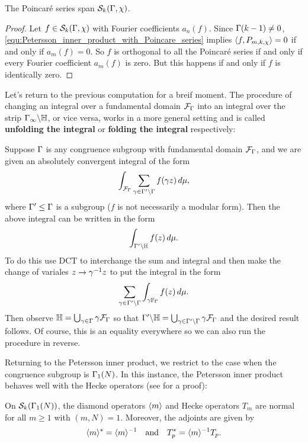       \begin{theorem}
        The Poincar\'e series span $\mathcal{S}_{k}(\Gamma,\chi)$.
      \end{theorem}
      \begin{proof}
        Let $f \in \mathcal{S}_{k}(\Gamma,\chi)$ with Fourier coefficients $a_{n}(f)$. Since $\Gamma(k-1) \neq 0$, \cref{equ:Petersson_inner_product_with_Poincare_series} implies $\langle f,P_{m,k,\chi}\rangle = 0$ if and only if $a_{m}(f) = 0$. So $f$ is orthogonal to all the Poincar\'e series if and only if every Fourier coefficient $a_{m}(f)$ is zero. But this happens if and only if $f$ is identically zero.
      \end{proof}

      Let's return to the previous computation for a breif moment. The procedure of changing an integral over a fundamental domain $\mathcal{F}_{\Gamma}$ into an integral over the strip $\Gamma_{\infty}\backslash\mathbb{H}$, or vice versa, works in a more general setting and is called \textbf{unfolding the integral} or \textbf{folding the integral} respectively:

      \begin{method}
        Suppose $\Gamma$ is any congruence subgroup with fundamental domain $\mathcal{F}_{\Gamma}$, and we are given an absolutely convergent integral of the form
        \[
          \int_{\mathcal{F}_{\Gamma}}\sum_{\gamma \in \Gamma'\backslash\Gamma}f(\gamma z)\,d\mu,
        \]
        where $\Gamma' \le \Gamma$ is a subgroup ($f$ is not necessarily a modular form). Then the above integral can be written in the form
        \[
          \int_{\Gamma'\backslash\mathbb{H}}f(z)\,d\mu.
        \]
        To do this use DCT to interchange the sum and integral and then make the change of variales $z \to \gamma^{-1}z$ to put the integral in the form
        \[
          \sum_{\gamma \in \Gamma'\backslash\Gamma}\int_{\gamma\mathbb{F}_{\Gamma}}f(z)\,d\mu.
        \]
        Then observe $\mathbb{H} = \bigcup_{\gamma \in \Gamma}\gamma\mathcal{F}_{\Gamma}$ so that $\Gamma'\backslash\mathbb{H} = \bigcup_{\gamma \in \Gamma'\backslash\Gamma}\gamma\mathcal{F}_{\Gamma}$ and the desired result follows. Of course, this is an equality everywhere so we can also run the procedure in reverse.
      \end{method}

      Returning to the Petersson inner product, we restrict to the case when the congruence subgroup is $\Gamma_{1}(N)$. In this instance, the Petersson inner product behaves well with the Hecke operators (see \cite{lang2012introduction} for a proof):

      \begin{proposition}\label{prop:Hecke_operators_normal}
        On $\mathcal{S}_{k}(\Gamma_{1}(N))$, the diamond operators $\langle m\rangle$ and Hecke operators $T_{m}$ are normal for all $m \ge 1$ with $(m,N) = 1$. Moreover, the adjoints are given by
        \[
          \langle m\rangle^{\ast} = \langle m\rangle^{-1} \quad \text{and} \quad T_{p}^{\ast} = \langle m\rangle^{-1}T_{p}.
        \]
      \end{proposition}

